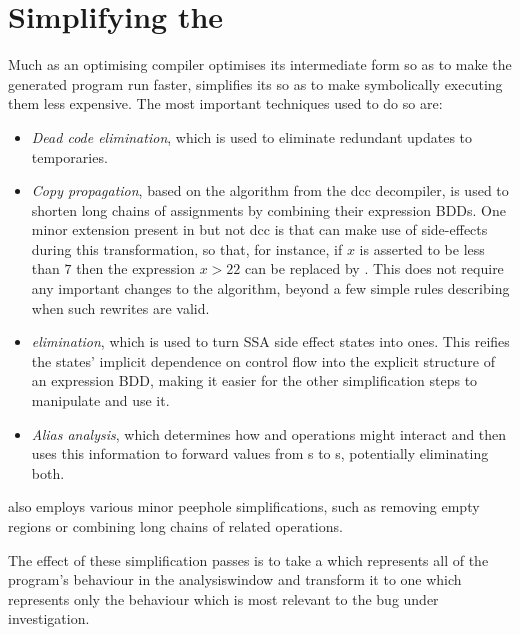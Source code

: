 \section{Simplifying the {\StateMachine}}
\label{sect:derive:simplify_sm}

Much as an optimising compiler optimises its intermediate form so as
to make the generated program run faster, {\technique} simplifies its
{\StateMachines} so as to make symbolically executing them less
expensive.  The most important techniques used to do so are:
\begin{itemize}
\item \emph{Dead code elimination}, which is used to eliminate
  redundant updates to {\StateMachine} temporaries.
\item \emph{Copy propagation}, based on the algorithm from the
  dcc\cite{Cifuentes1994} decompiler, is used to shorten long chains
  of assignments by combining their expression BDDs.  One minor
  extension present in {\technique} but not dcc is that {\technique}
  can make use of  side-effects during this
  transformation, so that, for instance, if $x$ is asserted to be less
  than $7$ then the expression $x > 22$ can be replaced by \false.
  This does not require any important changes to the algorithm, beyond
  a few simple rules describing when such rewrites are valid.
\item \emph{{\stPhi} elimination}, which is used to turn SSA {\stPhi}
  side effect states into  ones.  This reifies the {\stPhi}
  states' implicit dependence on {\StateMachine} control flow into the
  explicit structure of an expression BDD, making it easier for the
  other simplification steps to manipulate and use it.
\item \emph{Alias analysis}, which determines how  and
   operations might interact and then uses this
  information to forward values from s to s,
  potentially eliminating both.
\end{itemize}
{\Technique} also employs various minor peephole simplifications, such
as removing empty  regions or combining long chains of
related  operations.

The effect of these simplification passes is to take a {\StateMachine}
which represents all of the program's behaviour in the
\gls{analysiswindow} and transform it to one which represents only the
behaviour which is most relevant to the bug under
investigation.

